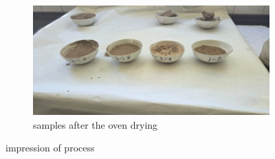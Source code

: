 \begin{figure}[H]
    \begin{subfigure}[H]{0.48\textwidth}
        \includegraphics[width=12cm,]{figures/appendix-f/samplesafterheat.png}
        \caption{samples after the oven drying}
        \label{fig:sato}
    \end{subfigure}
    \caption{impression of process}
    \label{fig:all_three}
\end{figure}


